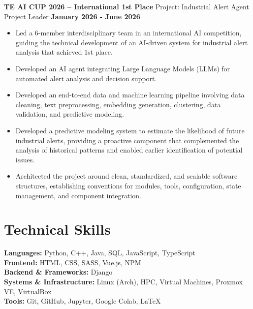 \documentclass[11pt]{article}
\begin{document}
\textbf{TE AI CUP 2026 -- International 1st Place} \hfill Project: Industrial Alert Agent\\
Project Leader \hfill \textbf{January 2026 - June 2026}
\vspace{-0.3cm}
\begin{itemize}[leftmargin=*]
    \item Led a 6-member interdisciplinary team in an international AI competition, guiding the technical development of an AI-driven system for industrial alert analysis that achieved 1st place. 

    \vspace{-0.3cm} 
    \item Developed an AI agent integrating Large Language Models (LLMs) for automated alert analysis and decision support.

    \vspace{-0.3cm} 
    \item Developed an end-to-end data and machine learning pipeline involving data cleaning, text preprocessing, embedding generation, clustering, data validation, and predictive modeling. 

    \vspace{-0.3cm}
    \item Developed a predictive modeling system to estimate the likelihood of future industrial alerts, providing a proactive component that complemented the analysis of historical patterns and enabled earlier identification of potential issues.

    \vspace{-0.3cm} 
    \item Architected the project around clean, standardized, and scalable software structures, establishing conventions for modules, tools, configuration, state management, and component integration. 
\end{itemize}





\section*{Technical Skills}
\textbf{Languages:} Python, C++, Java, SQL, JavaScript, TypeScript\\
\textbf{Frontend:} HTML, CSS, SASS, Vue.js, NPM\\
\textbf{Backend \& Frameworks:} Django\\
\textbf{Systems \& Infrastructure:} Linux (Arch), HPC, Virtual Machines, Proxmox VE, VirtualBox\\
\textbf{Tools:} Git, GitHub, Jupyter, Google Colab, LaTeX
\end{document}
